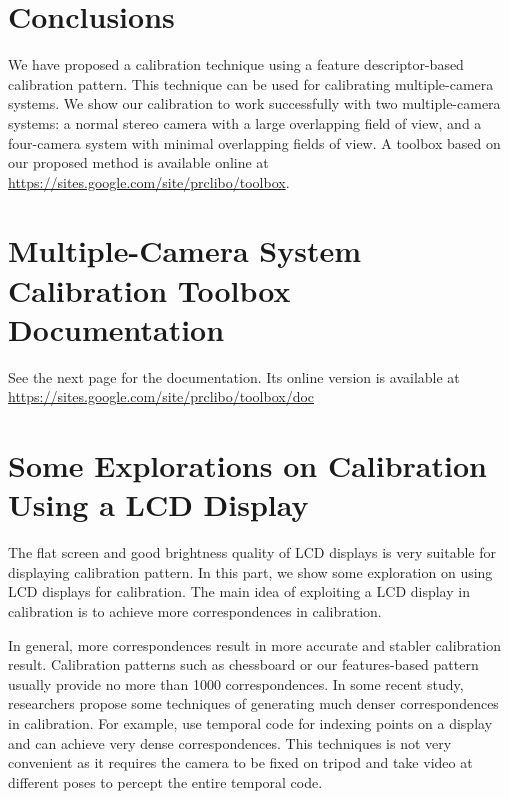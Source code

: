 \documentclass{report}
\begin{document}
\chapter{Conclusions}
We have proposed a calibration technique using a feature descriptor-based calibration pattern. This technique can be used for calibrating multiple-camera systems. We show our calibration to work successfully with two multiple-camera systems: a normal stereo camera with a large overlapping field of view, and a four-camera system with minimal overlapping fields of view. A toolbox based on our proposed method is available online at {\small{\url{https://sites.google.com/site/prclibo/toolbox}}}. 


\appendix
\chapter{Multiple-Camera System Calibration Toolbox Documentation}

See the next page for the documentation. Its online version is available at {\small{\url{https://sites.google.com/site/prclibo/toolbox/doc}}}



\chapter{Some Explorations on Calibration Using a LCD Display}
The flat screen and good brightness quality of LCD displays is very suitable for displaying calibration pattern. In this part, we show some exploration on using LCD displays for calibration. The main idea of exploiting a LCD display in calibration is to achieve more correspondences in calibration. 

In general, more correspondences result in more accurate and stabler calibration result. Calibration patterns such as chessboard or our features-based pattern usually provide no more than 1000 correspondences. In some recent study, researchers propose some techniques of generating much denser correspondences in calibration.  For example, \cite{grosse2012camera, schmalz2011camera} use temporal code for indexing points on a display and can achieve very dense correspondences. This techniques is not very convenient as it requires the camera to be fixed on tripod and take video at different poses to percept the entire temporal code. 
\end{document}
